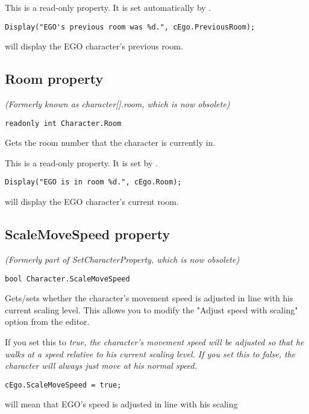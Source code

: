This is a read-only property. It is set automatically by .

\begin{verbatim}
Display("EGO's previous room was %d.", cEgo.PreviousRoom);
\end{verbatim}
will display the EGO character's previous room.


\subsection{Room property}\label{Character.Room}%

\it{(Formerly known as character[].room, which is now obsolete)}

\begin{verbatim}
readonly int Character.Room
\end{verbatim}
Gets the room number that the character is currently in.

This is a read-only property. It is set by .

\begin{verbatim}
Display("EGO is in room %d.", cEgo.Room);
\end{verbatim}
will display the EGO character's current room.


\subsection{ScaleMoveSpeed property}\label{Character.ScaleMoveSpeed}%

\it{(Formerly part of SetCharacterProperty, which is now obsolete)}

\begin{verbatim}
bool Character.ScaleMoveSpeed
\end{verbatim}
Gets/sets whether the character's movement speed is adjusted in line with his
current scaling level. This allows you to modify the "Adjust speed with scaling" option
from the editor.

If you set this to \it{true}, the character's movement speed will be adjusted so that he walks
at a speed relative to his current scaling level. If you set this to \it{false}, the character
will always just move at his normal speed.

\begin{verbatim}
cEgo.ScaleMoveSpeed = true;
\end{verbatim}
will mean that EGO's speed is adjusted in line with his scaling

